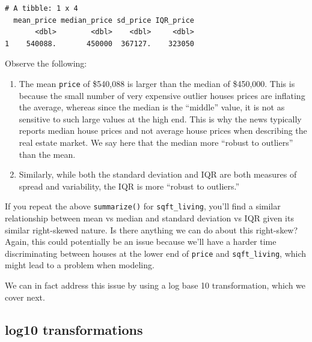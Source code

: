 \documentclass[12pt, krantz2,]{krantz}
\makeatletter
\newenvironment{Shaded}{\begin{snugshade}}{\end{snugshade}}
\newcommand{\DataTypeTok}[1]{\textcolor[rgb]{0.27,0.27,0.27}{#1}}
\newcommand{\KeywordTok}[1]{\textcolor[rgb]{0.27,0.27,0.27}{\textbf{#1}}}
\newcommand{\NormalTok}[1]{#1}
\newcommand{\OperatorTok}[1]{\textcolor[rgb]{0.43,0.43,0.43}{\textbf{#1}}}
\newcommand{\StringTok}[1]{\textcolor[rgb]{0.5,0.5,0.5}{#1}}
\providecommand{\tightlist}{%
  \setlength{\itemsep}{0pt}\setlength{\parskip}{0pt}}
\newenvironment{kframe}{%
\medskip{}
\setlength{\fboxsep}{.8em}
 \def\at@end@of@kframe{}%
 \ifinner\ifhmode%
  \def\at@end@of@kframe{\end{minipage}}%
  \begin{minipage}{\columnwidth}%
 \fi\fi%
 \def\FrameCommand##1{\hskip\@totalleftmargin \hskip-\fboxsep
 \colorbox{shadecolor}{##1}\hskip-\fboxsep
     \hskip-\linewidth \hskip-\@totalleftmargin \hskip\columnwidth}%
 \MakeFramed {\advance\hsize-\width
   \@totalleftmargin\z@ \linewidth\hsize
   \@setminipage}}%
 {\par\unskip\endMakeFramed%
 \at@end@of@kframe}
\renewenvironment{Shaded}{\begin{kframe}}{\end{kframe}}
\makeatother
\begin{document}
\begin{Shaded}
\end{Shaded}

\begin{verbatim}
# A tibble: 1 x 4
  mean_price median_price sd_price IQR_price
       <dbl>        <dbl>    <dbl>     <dbl>
1    540088.       450000  367127.    323050
\end{verbatim}

Observe the following:

\begin{enumerate}
\def\labelenumi{\arabic{enumi}.}
\tightlist
\item
  The mean \texttt{price} of \$540,088 is larger than the median of \$450,000. This is because the small number of very expensive outlier houses prices are inflating the average, whereas since the median is the ``middle'' value, it is not as sensitive to such large values at the high end. This is why the news typically reports median house prices and not average house prices when describing the real estate market. We say here that the median more ``robust to outliers'' than the mean.
\item
  Similarly, while both the standard deviation and IQR are both measures of spread and variability, the IQR is more ``robust to outliers.''
\end{enumerate}

If you repeat the above \texttt{summarize()} for \texttt{sqft\_living}, you'll find a similar relationship between mean vs median and standard deviation vs IQR given its similar right-skewed nature. Is there anything we can do about this right-skew? Again, this could potentially be an issue because we'll have a harder time discriminating between houses at the lower end of \texttt{price} and \texttt{sqft\_living}, which might lead to a problem when modeling.

We can in fact address this issue by using a log base 10 transformation, which we cover next.

\hypertarget{log10-transformations}{%
\subsection{log10 transformations}\label{log10-transformations}}
\end{document}
